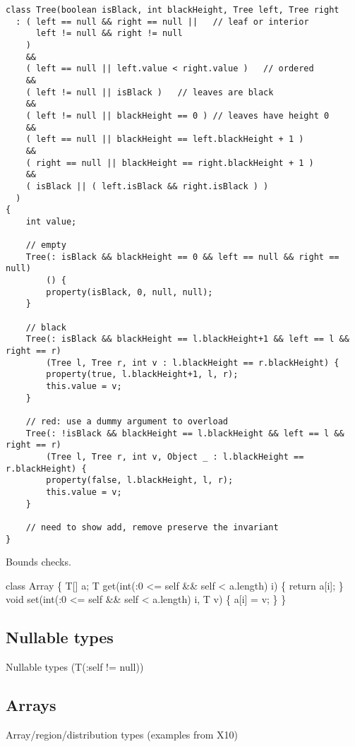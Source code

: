 \begin{verbatim}
class Tree(boolean isBlack, int blackHeight, Tree left, Tree right
  : ( left == null && right == null ||   // leaf or interior
      left != null && right != null
    )
    &&
    ( left == null || left.value < right.value )   // ordered
    &&
    ( left != null || isBlack )   // leaves are black
    &&
    ( left != null || blackHeight == 0 ) // leaves have height 0
    &&
    ( left == null || blackHeight == left.blackHeight + 1 )
    &&
    ( right == null || blackHeight == right.blackHeight + 1 )
    &&
    ( isBlack || ( left.isBlack && right.isBlack ) )
  )
{
    int value;

    // empty
    Tree(: isBlack && blackHeight == 0 && left == null && right == null)
        () {
        property(isBlack, 0, null, null);
    }

    // black
    Tree(: isBlack && blackHeight == l.blackHeight+1 && left == l && right == r)
        (Tree l, Tree r, int v : l.blackHeight == r.blackHeight) {
        property(true, l.blackHeight+1, l, r);
        this.value = v;
    }
       
    // red: use a dummy argument to overload
    Tree(: !isBlack && blackHeight == l.blackHeight && left == l && right == r)
        (Tree l, Tree r, int v, Object _ : l.blackHeight == r.blackHeight) {
        property(false, l.blackHeight, l, r);
        this.value = v;
    }

    // need to show add, remove preserve the invariant
}
\end{verbatim}

Bounds checks.

\begin{code}
class Array \{
    T[] a;
    T get(int(:0 <= self \&\& self < a.length) i) \{ return a[i]; \}
    void set(int(:0 <= self \&\& self < a.length) i, T v) \{ a[i] = v; \}
\}
\end{code}

\subsection{Nullable types}

Nullable types (T(:self != null))

\subsection{Arrays}

Array/region/distribution types (examples from X10)

